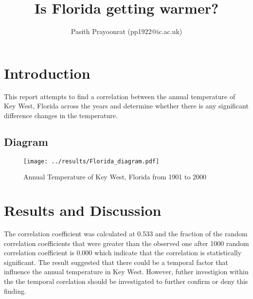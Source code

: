 \documentclass[12pt]{article}
\title{Is Florida getting warmer?}
\author{Pasith Prayoonrat (pp1922@ic.ac.uk)}
\begin{document}
  \maketitle

\section{Introduction}
    This report attempts to find a correlation between the annual temperature of Key West, Florida across the years and determine whether there is any significant difference changes in the temperature.
\subsection*{Diagram}
\begin{figure}[H]
\centering
\texttt{[image: ../results/Florida\_diagram.pdf]}
\caption{\label{fig:Florida_graph} Annual Temperature of Key West, Florida from 1901 to 2000}
\end{figure}

\section{Results and Discussion}
    The correlation coefficient was calculated at 0.533 and the fraction of the random correlation coefficients that were greater than the observed one after 1000 random correlation coefficient is 0.000 which indicate that the correlation is statistically significant. The result suggested that there could be a temporal factor that influence the annual temperature in Key West. However, futher investigion within the the temporal corelation should be investigated to further confirm or deny this finding.
\end{document}
